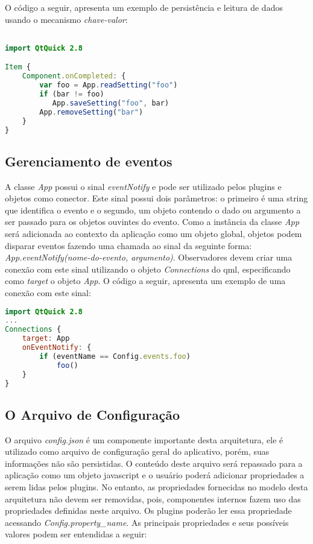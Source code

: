 O código a seguir, apresenta um exemplo de persistência e leitura de dados usando o mecanismo \textit{chave-valor}:

\begin{center}
\begin{lstlisting}[language=qml]

import QtQuick 2.8

Item {
    Component.onCompleted: {
		var foo = App.readSetting("foo")
		if (bar != foo)
		   App.saveSetting("foo", bar)
		App.removeSetting("bar")
    }
}
\end{lstlisting}
\end{center}


\subsection{Gerenciamento de eventos}
A classe \textit{App} possui o sinal \textit{eventNotify} e pode ser utilizado pelos plugins e objetos como conector. Este sinal possui dois parâmetros: o primeiro é uma string que identifica o evento e o segundo, um objeto contendo o dado ou argumento a ser passado para os objetos ouvintes do evento. Como a instância da classe \textit{App} será adicionada ao contexto da aplicação como um objeto global, objetos podem disparar eventos fazendo uma chamada ao sinal da seguinte forma: \textit{App.eventNotify(nome-do-evento, argumento)}. Observadores devem criar uma conexão com este sinal utilizando o objeto \textit{Connections} do qml, especificando como \textit{target} o objeto \textit{App}. O código a seguir, apresenta um exemplo de uma conexão com este sinal:

\begin{center}
\begin{lstlisting}[language=qml]
import QtQuick 2.8
...
Connections {
    target: App
    onEventNotify: {
        if (eventName == Config.events.foo)
            foo()
    }
}
\end{lstlisting}
\end{center}


\subsection{O Arquivo de Configuração}\label{sec:solucao-desenvolvida}
O arquivo \textit{config.json} é um componente importante desta arquitetura, ele é utilizado como arquivo de configuração geral do aplicativo, porém, suas informações não são persistidas. O conteúdo deste arquivo será repassado para a aplicação como um objeto javascript e o usuário poderá adicionar propriedades a serem lidas pelos plugins. No entanto, as propriedades fornecidas no modelo desta arquitetura não devem ser removidas, pois, componentes internos fazem uso das propriedades definidas neste arquivo. Os plugins poderão ler essa propriedade acessando \textit{Config.property\_name}. As principais propriedades e seus possíveis valores podem ser entendidas a seguir:


